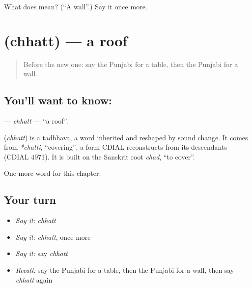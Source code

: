 \begin{tcolorbox}[breakable,colback=teal!4,colframe=teal!35!black,title={Before you move on}]
What does  mean? (\textquotedblleft{}A wall\textquotedblright{}.) Say it once more.
\end{tcolorbox}
\section[\texorpdfstring{\pa{ਛੱਤ} (chhatt)}{ਛੱਤ (chhatt)}]{ (chhatt) — a roof}

\label{lesson:PA-C68-chhatt}



\begin{quote}
Before the new one: say the Punjabi for a table, then the Punjabi for a wall.
\end{quote}

\subsection*{You'll want to know: }
\textbf{} — \emph{chhatt} — \textquotedblleft{}a roof\textquotedblright{}.

\begin{cousinweb}
\textbf{} (\emph{chhatt}) is a tadbhava, a word inherited and reshaped by sound change. It comes from \emph{*chatti}, \textquotedblleft{}covering\textquotedblright{}, a form CDIAL reconstructs from its descendants (CDIAL 4971). It is built on the Sanskrit root \emph{chad}, \textquotedblleft{}to cover\textquotedblright{}.
\end{cousinweb}

\begin{grammarlens}[title={What you've built}]
One more word for this chapter.
\end{grammarlens}

\subsection*{Your turn}
\begin{itemize}
\raggedright
  \item \emph{Say it:} \emph{chhatt}
  \item \emph{Say it:} \emph{chhatt}, once more
  \item \emph{Say it:} say \emph{chhatt}
  \item \emph{Recall:} say the Punjabi for a table, then the Punjabi for a wall, then say \emph{chhatt} again
\end{itemize}

